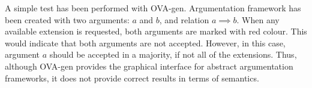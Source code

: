 A simple test has been performed with OVA-gen. Argumentation framework has been created with two arguments: $a$ and $b$, and relation $a \implies b$. When any available extension is requested, both arguments are marked with red colour. This would indicate that both arguments are not accepted. However, in this case, argument $a$ should be accepted in a majority, if not all of the extensions. Thus, although OVA-gen provides the graphical interface for abstract argumentation frameworks, it does not provide correct results in terms of semantics.